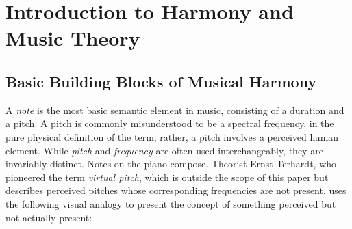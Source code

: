 \section{Introduction to Harmony and Music Theory}

\subsection{Basic Building Blocks of Musical Harmony}

A \textit{note} is the most basic semantic element in music, consisting of a duration and a pitch. A pitch is commonly misunderstood to be a spectral frequency, in the pure physical definition of the term; rather, a pitch involves a perceived human element. While \textit{pitch} and \textit{frequency} are often used interchangeably, they are invariably distinct. Notes on the piano compose. Theorist Ernst Terhardt, who pioneered the term \textit{virtual pitch}, which is outside the scope of this paper but describes perceived pitches whose corresponding frequencies are not present, uses the following visual analogy to present the concept of something perceived but not actually present:





